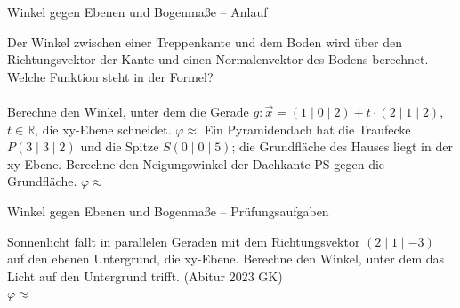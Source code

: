 \begin{aufgabe}{Winkel gegen Ebenen und Bogenmaße – Anlauf}
\begin{teile}
\teil Der Winkel zwischen einer Treppenkante und dem Boden wird über den Richtungsvektor der Kante und einen Normalenvektor des Bodens berechnet. Welche Funktion steht in der Formel? \\  \\ 
\teil Berechne den Winkel, unter dem die Gerade $g\colon \vec x = (1 \mid 0 \mid 2) + t \cdot (2 \mid 1 \mid 2)$, $t \in \mathbb{R}$, die xy-Ebene schneidet. $\varphi \approx$ \leerfeld[$^\circ$]
\teil Ein Pyramidendach hat die Traufecke $P(3 \mid 3 \mid 2)$ und die Spitze $S(0 \mid 0 \mid 5)$; die Grundfläche des Hauses liegt in der xy-Ebene. Berechne den Neigungswinkel der Dachkante PS gegen die Grundfläche. $\varphi \approx$ \leerfeld[$^\circ$]
\end{teile}
\end{aufgabe}

\begin{aufgabe}{Winkel gegen Ebenen und Bogenmaße – Prüfungsaufgaben}
\begin{teile}
\teil Sonnenlicht fällt in parallelen Geraden mit dem Richtungsvektor $(2 \mid 1 \mid -3)$ auf den ebenen Untergrund, die xy-Ebene. Berechne den Winkel, unter dem das Licht auf den Untergrund trifft. \hfill (Abitur 2023 GK) \\ $\varphi \approx$ \leerfeld[$^\circ$]
\end{teile}
\end{aufgabe}
